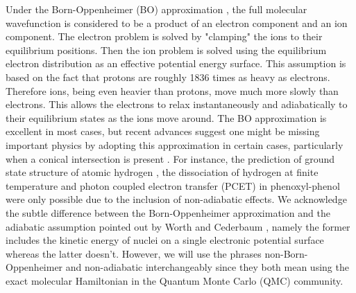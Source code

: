 Under the Born-Oppenheimer (BO) approximation \cite{BO}, the full molecular wavefunction is considered to be a product of an electron component and an ion component. The electron problem is solved by "clamping" the ions to their equilibrium positions. Then the ion problem is solved using the equilibrium electron distribution as an effective potential energy surface. This assumption is based on the fact that protons are roughly 1836 times as heavy as electrons. Therefore ions, being even heavier than protons, move much more slowly than electrons. This allows the electrons to relax instantaneously and adiabatically to their equilibrium states as the ions move around. The BO approximation is excellent in most cases, but recent advances suggest one might be missing important physics by adopting this approximation in certain cases, particularly when a conical intersection is present \cite{Cederbaum_BO}. For instance, the prediction of ground state structure of atomic hydrogen \cite{Ceperley_1987,Natoli_1993,Natoli_1995}, the dissociation of hydrogen at finite temperature \cite{Mazzola_FiniteT} and photon coupled electron transfer (PCET) in phenoxyl-phenol \cite{Sirjoosingh_PCET} were only possible due to the inclusion of non-adiabatic effects. We acknowledge the subtle difference between the Born-Oppenheimer approximation and the adiabatic assumption pointed out by Worth and Cederbaum \cite{Cederbaum_BO}, namely the former includes the kinetic energy of nuclei on a single electronic potential surface whereas the latter doesn't. However, we will use the phrases non-Born-Oppenheimer and non-adiabatic interchangeably since they both mean using the exact molecular Hamiltonian in the Quantum Monte Carlo (QMC) community.

